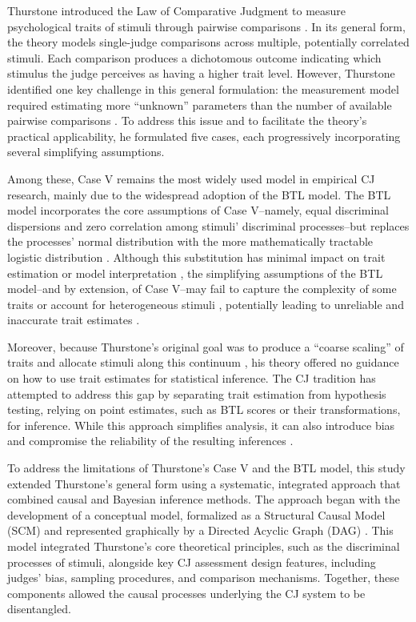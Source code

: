 \documentclass[
  authoryear,
  review,
  1p]{elsarticle}
\begin{document}
Thurstone introduced the Law of Comparative Judgment to measure
psychological traits of stimuli through pairwise comparisons
\citep{Thurstone_1927a, Thurstone_1927b}. In its general form, the
theory models single-judge comparisons across multiple, potentially
correlated stimuli. Each comparison produces a dichotomous outcome
indicating which stimulus the judge perceives as having a higher trait
level. However, Thurstone identified one key challenge in this general
formulation: the measurement model required estimating more ``unknown''
parameters than the number of available pairwise comparisons
\citep{Thurstone_1927b}. To address this issue and to facilitate the
theory's practical applicability, he formulated five cases, each
progressively incorporating several simplifying assumptions.

Among these, Case V remains the most widely used model in empirical CJ
research, mainly due to the widespread adoption of the BTL model. The
BTL model incorporates the core assumptions of Case V--namely, equal
discriminal dispersions and zero correlation among stimuli' discriminal
processes--but replaces the processes' normal distribution with the more
mathematically tractable logistic distribution
\citep{Andrich_1978, Bramley_2008}. Although this substitution has
minimal impact on trait estimation or model interpretation
\citep{vanderLinden_et_al_2017_I, McElreath_2021}, the simplifying
assumptions of the BTL model--and by extension, of Case V--may fail to
capture the complexity of some traits or account for heterogeneous
stimuli
\citep{Thurstone_1927a, Andrich_1978, Bramley_2008, Kelly_et_al_2022},
potentially leading to unreliable and inaccurate trait estimates
\citep{Ackerman_1989, Zimmerman_1994, McElreath_2020, Hoyle_et_al_2023}.

Moreover, because Thurstone's original goal was to produce a ``coarse
scaling'' of traits and allocate stimuli along this continuum
\citep[p.~269]{Thurstone_1927a}, his theory offered no guidance on how
to use trait estimates for statistical inference. The CJ tradition has
attempted to address this gap by separating trait estimation from
hypothesis testing, relying on point estimates, such as BTL scores or
their transformations, for inference. While this approach simplifies
analysis, it can also introduce bias and compromise the reliability of
the resulting inferences
\citep{McElreath_2020, Kline_et_al_2023, Hoyle_et_al_2023}.

To address the limitations of Thurstone's Case V and the BTL model, this
study extended Thurstone's general form using a systematic, integrated
approach that combined causal and Bayesian inference methods. The
approach began with the development of a conceptual model, formalized as
a Structural Causal Model (SCM) and represented graphically by a
Directed Acyclic Graph (DAG)
\citep{Pearl_2009, Pearl_et_al_2016, Gross_et_al_2018, Neal_2020}. This
model integrated Thurstone's core theoretical principles, such as the
discriminal processes of stimuli, alongside key CJ assessment design
features, including judges' bias, sampling procedures, and comparison
mechanisms. Together, these components allowed the causal processes
underlying the CJ system to be disentangled.
\end{document}
